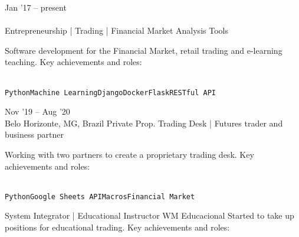 \documentclass[10pt]{developercv} %
\begin{document}


\begin{entrylist}
  \entry
  {Jan '17 -- present\\\footnotesize{}\\\footnotesize{}}
  {Entrepreneurship | Trading | Financial Market Analysis Tools}
  {}
  {Software development for the Financial Market, retail trading and e-learning teaching. Key achievements and roles:\\
    \begin{contributionlist}
    \end{contributionlist}\\
    \texttt{Python}\slashsep\texttt{Machine Learning}\slashsep\texttt{Django}\slashsep\texttt{Docker}\slashsep\texttt{Flask}\slashsep\texttt{RESTful API}}
  \entry
  {Nov '19 -- Aug '20\\\footnotesize{Belo Horizonte, MG, Brazil}}
  {Private Prop. Trading Desk | Futures trader and business partner}
  {}
  {Working with two partners to create a proprietary trading desk. Key achievements and roles:\\
    \begin{contributionlist}
    \end{contributionlist}\\
    \texttt{Python}\slashsep\texttt{Google Sheets API}\slashsep\texttt{Macros}\slashsep\texttt{Financial Market}}
  {System Integrator | Educational Instructor}
  {WM Educacional}
  {
    Started to take up positions for educational trading. Key achievements and roles:\\
}
\end{entrylist}
\end{document}
